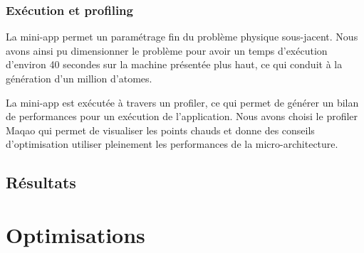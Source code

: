 \documentclass[11pt,a4paper]{article}
\begin{document}
		\subsubsection{Exécution et profiling}

			La mini-app permet un paramétrage fin du problème physique sous-jacent. Nous avons ainsi pu dimensionner le problème pour avoir un temps d'exécution d'environ 40 secondes sur la machine présentée plus haut, ce qui conduit à la génération d'un million d'atomes.

			La mini-app est exécutée à travers un profiler, ce qui permet de générer un bilan de performances pour un exécution de l'application. Nous avons choisi le profiler Maqao qui permet de visualiser les points chauds et donne des conseils d'optimisation utiliser pleinement les performances de la micro-architecture.

	\subsection{Résultats}

		\subsubsection{}

\section{Optimisations}
\end{document}
